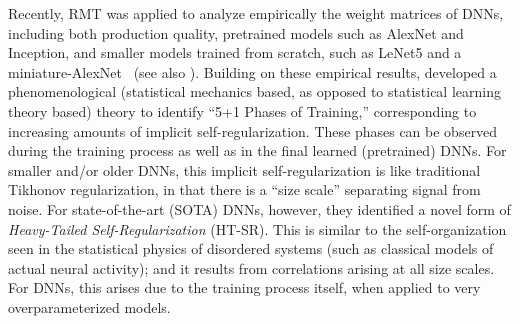 \documentclass{article}
\begin{document}
Recently, RMT was applied to analyze empirically the weight matrices of DNNs, including both production quality, pretrained models such as AlexNet and Inception, and smaller models trained from scratch, such as LeNet5 and a miniature-AlexNet~\citep{MM18_TR} (see also \citep{MM17_TR, MM18_TR, MM19_HTSR_ICML, MM20_SDM, MM19_KDD}).
Building on these empirical results, 
\citet{MM18_TR} developed a phenomenological (statistical mechanics based, as opposed to statistical learning theory based) theory to identify ``5+1 Phases of Training,'' corresponding to increasing amounts of implicit self-regularization.
These phases can be observed during the training process as well as in the final learned (pretrained) DNNs.
For smaller and/or older DNNs, this implicit self-regularization is like traditional Tikhonov regularization, in that there is a ``size scale'' separating signal from noise.
For state-of-the-art (SOTA) DNNs, however, they identified a novel form of \emph{Heavy-Tailed Self-Regularization} (HT-SR).
This is similar to the self-organization seen in the statistical physics of disordered systems (such as classical models of actual neural activity); and 
it results from correlations arising at all size scales.
For DNNs, this arises due to the training process itself, when applied to very overparameterized models.
\end{document}
